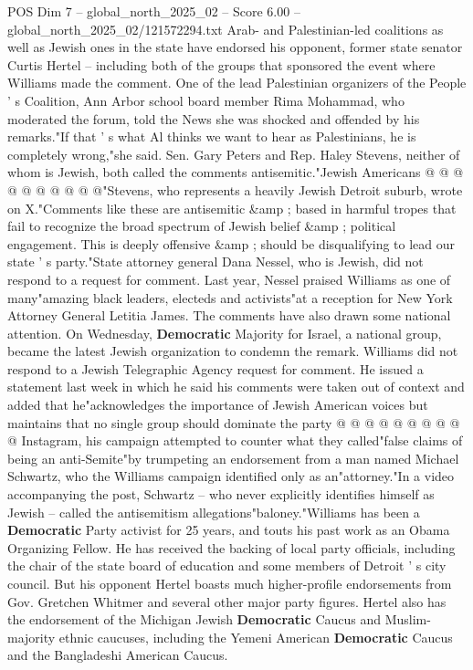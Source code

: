 \begin{textsample}{POS Dim 7 – global\_north\_2025\_02 – Score 6.00 – global\_north\_2025\_02/121572294.txt}
Arab- and Palestinian-led coalitions as well as Jewish ones in the state have endorsed his opponent, former state senator Curtis Hertel -- including both of the groups that sponsored the event where Williams made the comment.
One of the lead Palestinian organizers of the People ' s Coalition, Ann Arbor school board member Rima Mohammad, who moderated the forum, told the News she was shocked and offended by his remarks."If that ' s what Al thinks we want to hear as Palestinians, he is completely wrong,"she said.
Sen.
Gary Peters and Rep.
Haley Stevens, neither of whom is Jewish, both called the comments antisemitic."Jewish Americans @ @ @ @ @ @ @ @ @ @"Stevens, who represents a heavily Jewish Detroit suburb, wrote on X."Comments like these are antisemitic \&amp ; based in harmful tropes that fail to recognize the broad spectrum of Jewish belief \&amp ; political engagement.
This is deeply offensive \&amp ; should be disqualifying to lead our state ' s party."State attorney general Dana Nessel, who is Jewish, did not respond to a request for comment.
Last year, Nessel praised Williams as one of many"amazing black leaders, electeds and activists"at a reception for New York Attorney General Letitia James.
The comments have also drawn some national attention.
On Wednesday, \textbf{Democratic} Majority for Israel, a national group, became the latest Jewish organization to condemn the remark.
Williams did not respond to a Jewish Telegraphic Agency request for comment.
He issued a statement last week in which he said his comments were taken out of context and added that he"acknowledges the importance of Jewish American voices but maintains that no single group should dominate the party @ @ @ @ @ @ @ @ @ @ Instagram, his campaign attempted to counter what they called"false claims of being an anti-Semite"by trumpeting an endorsement from a man named Michael Schwartz, who the Williams campaign identified only as an"attorney."In a video accompanying the post, Schwartz -- who never explicitly identifies himself as Jewish -- called the antisemitism allegations"baloney."Williams has been a \textbf{Democratic} Party activist for 25 years, and touts his past work as an Obama Organizing Fellow.
He has received the backing of local party officials, including the chair of the state board of education and some members of Detroit ' s city council.
But his opponent Hertel boasts much higher-profile endorsements from Gov.
Gretchen Whitmer and several other major party figures.
Hertel also has the endorsement of the Michigan Jewish \textbf{Democratic} Caucus and Muslim-majority ethnic caucuses, including the Yemeni American \textbf{Democratic} Caucus and the Bangladeshi American Caucus.

\end{textsample}
